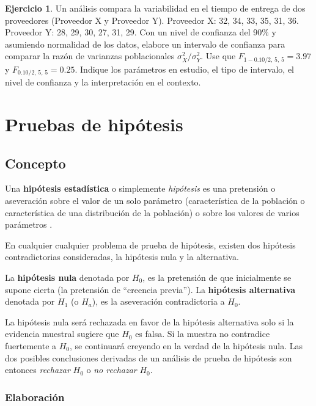 \documentclass[
  11pt,
]{book}
\theoremstyle{definition}
\theoremstyle{definition}
\theoremstyle{definition}
\newtheorem{exercise}{Ejercicio}[chapter]
\theoremstyle{definition}
\theoremstyle{remark}
\begin{document}
\begin{exercise}
Un análisis compara la variabilidad en el tiempo de entrega de dos proveedores (Proveedor X y Proveedor Y). Proveedor X: 32, 34, 33, 35, 31, 36. Proveedor Y: 28, 29, 30, 27, 31, 29. Con un nivel de confianza del 90\% y asumiendo normalidad de los datos, elabore un intervalo de confianza para comparar la razón de varianzas poblacionales \(\sigma^2_{X}/\sigma^2_{Y}\). Use que \(F_{1-0.10/2,\,5,\,5} = 3.97\) y \(F_{0.10/2,\,5,\,5} = 0.25\). Indique los parámetros en estudio, el tipo de intervalo, el nivel de confianza y la interpretación en el contexto.
\end{exercise}

\chapter{Pruebas de hipótesis}\label{PH}

\section{Concepto}\label{prueba-de-hipotesis-concepto}

Una \textbf{hipótesis estadística} o simplemente \emph{hipótesis} es una pretensión o aseveración sobre el valor de un solo parámetro (característica de la población o característica de una distribución de la población) o sobre los valores de varios parámetros \citep[página 285]{Devore} \citep[página 340]{anderson}.

En cualquier cualquier problema de prueba de hipótesis, existen dos hipótesis contradictorias consideradas, la hipótesis nula y la alternativa.

La \textbf{hipótesis nula} denotada por \(H_0\), es la pretensión de que inicialmente se supone cierta (la pretensión de ``creencia previa''). La \textbf{hipótesis alternativa} denotada por \(H_1\) (o \(H_a\)), es la aseveración contradictoria a \(H_0\).

La hipótesis nula será rechazada en favor de la hipótesis alternativa solo si la evidencia muestral sugiere que \(H_0\) es falsa. Si la muestra no contradice fuertemente a \(H_0\), se continuará creyendo en la verdad de la hipótesis nula. Las dos posibles conclusiones derivadas de un análisis de prueba de hipótesis son entonces \emph{rechazar} \(H_0\) o \emph{no rechazar} \(H_0\).

\subsection{Elaboración}\label{prueba-de-hipotesis-elaboracion}
\end{document}
